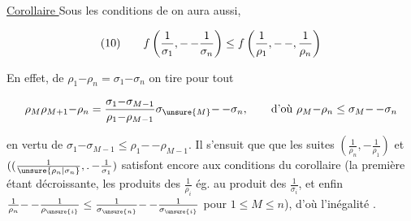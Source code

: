 \uline{Corollaire } Sous les conditions de       on aura aussi, 

\[
\begin{array}{@{}l@{\qquad}l@{}}
(10)&\displaystyle f\left(\frac1{\sigma_1},\mathord{-}\,\mathord{-}\frac1{\sigma_n}\right)\leq f\left(\frac1{\rho_1},\mathord{-}\,\mathord{-},\frac1{\rho_n}\right)
\end{array}
\]

En effet, de $\rho_1\mathord{-}\rho_n=\sigma_1\mathord{-}\sigma_n$ on tire pour tout
{\reversemarginpar{}}

\[
\rho_M\rho_{M+1}\mathord{-}\rho_n=\frac{\sigma_1\mathord{-}\sigma_{M-1}}{\rho_1\mathord{-}\rho_{M-1}}\sigma_{\unsure{M}}\mathord{-}\,\mathord{-}\sigma_n,\qquad\text{d'où }\rho_M\mathord{-}\rho_n\leq\sigma_M\mathord{-}\,\mathord{-}\sigma_n
\]

en vertu de $\sigma_1\mathord{-}\sigma_{M-1}\leq\rho_1\mathord{-}\,\mathord{-}\rho_{M-1}$. Il s'ensuit que que les suites $(\frac1{\rho_n},\mathord{-}\frac1{\rho_1})$ et $((\frac1{\unsure{\rho_n|\sigma_n}},\mathord{.}\,\mathord{-}\frac1{\sigma_1})$ satisfont encore aux conditions du corollaire (la première étant décroissante, les produits  des $\frac1{\rho_i}$ ég. au produit des $\frac1{\sigma_i}$, et enfin $\frac1{\rho_n}\mathord{-}\,\mathord{-}\frac1{\rho_{\unsure{i}}}\leq\frac1{\sigma_{\unsure{n}}}\mathord{-}\,\mathord{-}\frac1{\sigma_{\unsure{i}}}$ pour $1\leq M\leq n$), d'où l'inégalité .

{\reversemarginpar{}}
